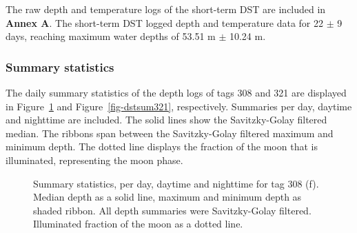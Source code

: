 \documentclass[
  authoryear,
  review,
  3p]{elsarticle}
\begin{document}
The raw depth and temperature logs of the short-term DST are included in
\textbf{Annex A}. The short-term DST logged depth and temperature data
for 22 \(\pm\) 9 days, reaching maximum water depths of 53.51 m \(\pm\)
10.24 m.

\hypertarget{sec-results-dst-summary}{%
\subsubsection{Summary statistics}\label{sec-results-dst-summary}}

The daily summary statistics of the depth logs of tags 308 and 321 are
displayed in Figure~\ref{fig-dstsum308} and Figure~\ref{fig-dstsum321},
respectively. Summaries per day, daytime and nighttime are included. The
solid lines show the Savitzky-Golay filtered median. The ribbons span
between the Savitzky-Golay filtered maximum and minimum depth. The
dotted line displays the fraction of the moon that is illuminated,
representing the moon phase.

\begin{figure}

\begin{minipage}[t]{\linewidth}

{\centering 


}

\end{minipage}%
\newline
\begin{minipage}[t]{0.50\linewidth}

{\centering 


}

\end{minipage}%
%
\begin{minipage}[t]{0.50\linewidth}

{\centering 


}

\end{minipage}%

\caption{\label{fig-dstsum308}Summary statistics, per day, daytime and
nighttime for tag 308 (f). Median depth as a solid line, maximum and
minimum depth as shaded ribbon. All depth summaries were Savitzky-Golay
filtered. Illuminated fraction of the moon as a dotted line.}

\end{figure}
\end{document}
